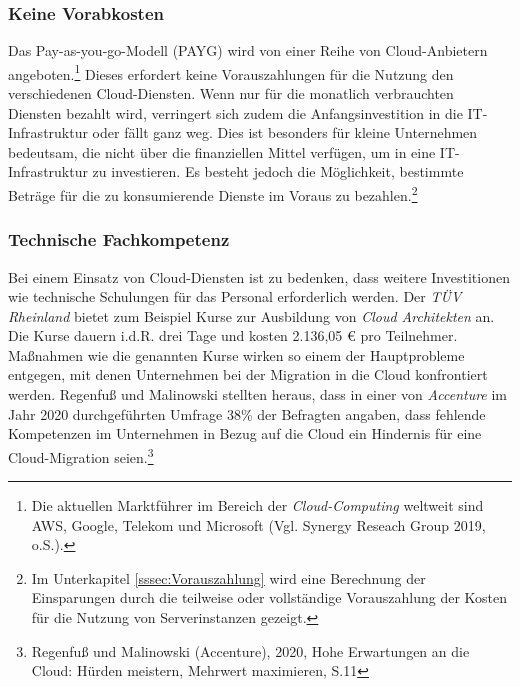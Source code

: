 \subsubsection{Keine Vorabkosten}
Das Pay-as-you-go-Modell (PAYG) wird von einer Reihe von Cloud-Anbietern angeboten.\footnote{Die aktuellen Marktführer im Bereich der \textit{Cloud-Computing} weltweit sind AWS, Google, Telekom und Microsoft (Vgl. Synergy Reseach Group 2019, o.S.\cite{STA6}).} Dieses erfordert keine Vorauszahlungen für die Nutzung den verschiedenen Cloud-Diensten. Wenn nur für die monatlich verbrauchten Diensten bezahlt wird, verringert sich zudem die Anfangsinvestition in die IT-Infrastruktur oder fällt ganz weg. Dies ist besonders für kleine Unternehmen bedeutsam, die nicht über die finanziellen Mittel verfügen, um in eine IT-Infrastruktur zu investieren. Es besteht jedoch die Möglichkeit, bestimmte Beträge für die zu konsumierende Dienste im Voraus zu bezahlen.\footnote{Im Unterkapitel \ref{sssec:Vorauszahlung} wird eine Berechnung der Einsparungen durch die teilweise oder vollständige Vorauszahlung der Kosten für die Nutzung von Serverinstanzen gezeigt.}  

\subsubsection{Technische Fachkompetenz}
Bei einem Einsatz von Cloud-Diensten ist zu bedenken, dass weitere Investitionen wie technische Schulungen für das Personal erforderlich werden. Der \textit{TÜV Rheinland} bietet zum Beispiel Kurse zur Ausbildung von \textit{Cloud Architekten} an. Die Kurse dauern i.d.R. drei Tage und kosten 2.136,05 € pro Teilnehmer. Maßnahmen wie die genannten Kurse wirken so einem der Hauptprobleme entgegen, mit denen Unternehmen bei der Migration in die Cloud konfrontiert werden. Regenfuß und Malinowski stellten heraus, dass in einer von \textit{Accenture} im Jahr 2020 durchgeführten Umfrage 38\% der Befragten angaben, dass fehlende Kompetenzen im Unternehmen in Bezug auf die Cloud ein Hindernis für eine Cloud-Migration seien.\footnote{Regenfuß und Malinowski (Accenture), 2020, Hohe Erwartungen an die Cloud: Hürden meistern, Mehrwert maximieren, S.11\cite{ACC1}}

